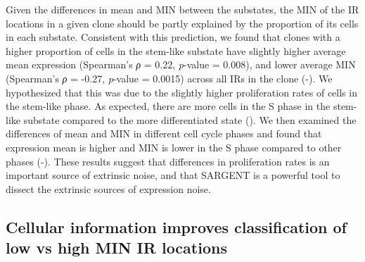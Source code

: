 \begin{figure}[t]
    \centering
\end{figure}

Given the differences in mean and MIN between the substates, the MIN of the IR locations in a given clone should be partly explained by the proportion of its cells in each substate. Consistent with this prediction, we found that clones with a higher proportion of cells in the stem-like substate have slightly higher average mean expression (Spearman’s \textit{ρ} = 0.22, \textit{p}-value = 0.008), and lower average MIN (Spearman’s \textit{ρ} = -0.27, \textit{p}-value = 0.0015) across all IRs in the clone (-). We hypothesized that this was due to the slightly higher proliferation rates of cells in the stem-like phase. As expected, there are more cells in the S phase in the stem-like substate compared to the more differentiated state (). We then examined the differences of mean and MIN in different cell cycle phases and found that expression mean is higher and MIN is lower in the S phase compared to other phases (-). These results suggest that differences in proliferation rates is an important source of extrinsic noise, and that SARGENT is a powerful tool to dissect the extrinsic sources of expression noise. 

\subsection{Cellular information improves classification of low vs high MIN IR locations}

